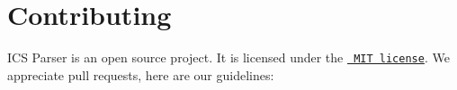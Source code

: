 \chapter{Contributing}
\hypertarget{md__c_1_2_users_2gallo_2_one_drive_2_documents_2_s_a_x_c3_x_a9-casali_2www_2wp-content_2plugins_de1ccde279e08b90cf0daf68b46b3e63}{}\label{md__c_1_2_users_2gallo_2_one_drive_2_documents_2_s_a_x_c3_x_a9-casali_2www_2wp-content_2plugins_de1ccde279e08b90cf0daf68b46b3e63}
\label{md__c_1_2_users_2gallo_2_one_drive_2_documents_2_s_a_x_c3_x_a9-casali_2www_2wp-content_2plugins_de1ccde279e08b90cf0daf68b46b3e63_autotoc_md733}%
%


ICS Parser is an open source project. It is licensed under the \href{https://opensource.org/licenses/MIT}{\texttt{ MIT license}}. We appreciate pull requests, here are our guidelines\+:



